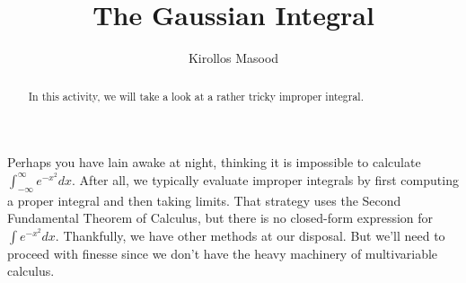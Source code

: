 \documentclass{ximera}
\title{The Gaussian Integral}
\author{Kirollos Masood}
\begin{document}
\begin{abstract}
In this activity, we will take a look at a rather tricky improper integral.
\end{abstract}
\maketitle

Perhaps you have lain awake at night, thinking it is impossible to calculate $\int_{-\infty}^{\infty} e^{-x^2}dx$. After all, we typically evaluate improper integrals by first computing a proper integral and then taking limits. That strategy uses the Second Fundamental Theorem of Calculus, but there is no closed-form expression for $\int e^{-x^2} dx$. Thankfully, we have other methods at our disposal. But we'll need to proceed with finesse since we don't have the heavy machinery of multivariable calculus.
\end{document}
